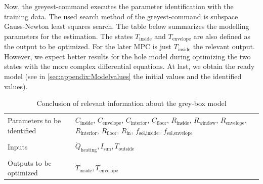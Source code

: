     Now, the greyest-command executes the parameter identification with the training data. The used search method of the greyest-command is subspace Gauss-Newton least squares search. The table below summarizes the modelling parameters for the estimation. The states $T_\text{inside}$ and $T_\text{envelope}$ are also defined as the output to be optimized. For the later MPC is just $T_\text{inside}$ the relevant output. However, we expect better results for the hole model during optimizing the two states with the more complex differential equations. 
    At last, we obtain the ready model (see in \autoref{sec:appendix:Modelvalues} the initial values and the identified values).
     
    \begin{table}[]
        \centering
        \begin{tabular}{p{5cm}|p{8cm}}
        Parameters to be identified &  $C_\text{inside}$,  $C_\text{envelope}$,  $C_\text{interior}$, $C_\text{floor}$, $R_\text{inside}$, $R_\text{window}$, $R_\text{envelope}$, $R_\text{interior}$, $R_\text{floor}$, $R_\text{in}$, $f_\text{sol,inside}$, $f_\text{sol,envelope}$ \\
        &\\
        Inputs & $\dot{Q}_\text{heating}, I_\text{sun}, T_\text{outside}$\\
        &\\
        Outputs to be optimized & $T_\text{inside}, T_\text{envelope}$
        \end{tabular}
        \caption{Conclusion of relevant information about the grey-box model}
        \label{tab:Greybox}
    \end{table}
    
